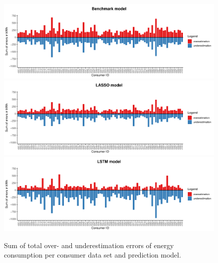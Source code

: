 \begin{figure}
    \centering
    \includegraphics[width=\textwidth]{thesis/graphs/evaluation/c_barplot_naive_overunderestimation.pdf}\\\vspace{.6cm}
    \includegraphics[width=\textwidth]{thesis/graphs/evaluation/c_barplot_LASSO_overunderestimation.pdf}\\\vspace{.6cm}
    \includegraphics[width=\textwidth]{thesis/graphs/evaluation/c_barplot_LSTM_overunderestimation.pdf}
    \caption[Sum of total over- and underestimation errors per consumer data set]{Sum of total over- and underestimation errors of energy consumption per consumer data set and prediction model. \quantnet\href{}{}}
    \label{Fig:overunderestimation}
\end{figure}
% 

